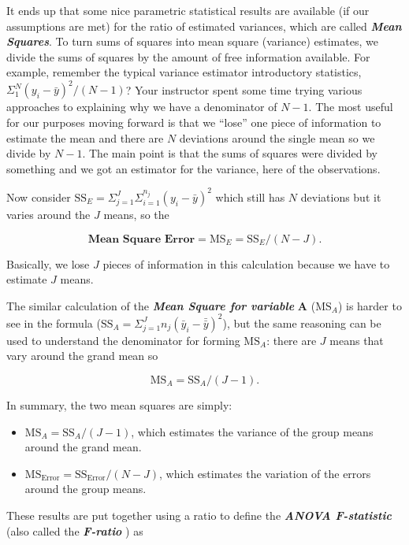 \documentclass[]{book}
\begin{document}
It ends up that some nice parametric statistical results are available
(if our assumptions are met) for the ratio of estimated variances, which
are called \textbf{\emph{Mean Squares}}. To turn sums of squares into
mean square (variance) estimates, we divide the sums of squares by the
amount of free information available. For example, remember the typical
variance estimator introductory statistics,
\(\Sigma^N_1(y_i-\bar{y})^2/(N-1)\)? Your instructor spent some time
trying various approaches to explaining why we have a denominator of
\(N-1\). The most useful for our purposes moving forward is that we
``lose'' one piece of information to estimate the mean and there are
\(N\) deviations around the single mean so we divide by \(N-1\). The
main point is that the sums of squares were divided by something and we
got an estimator for the variance, here of the observations.

Now consider
\(\text{SS}_E = \Sigma^J_{j=1}\Sigma^{n_j}_{i=1}(y_i-\bar{y})^2\) which
still has \(N\) deviations but it varies around the \(J\) means, so the

\[\textbf{Mean Square Error} = \text{MS}_E = \text{SS}_E/(N-J).\]

Basically, we lose \(J\) pieces of information in this calculation
because we have to estimate \(J\) means.

The similar calculation of the \textbf{\emph{Mean Square for variable}}
\(\mathbf{A}\) (\(\text{MS}_A\)) is harder to see in the formula
(\(\text{SS}_A = \Sigma^J_{j=1}n_j(\bar{y}_i-\bar{\bar{y}})^2\)), but
the same reasoning can be used to understand the denominator for forming
\(\text{MS}_A\): there are \(J\) means that vary around the grand mean
so

\[\text{MS}_A = \text{SS}_A/(J-1).\]

In summary, the two mean squares are simply:

\begin{itemize}
\item
  \(\text{MS}_A = \text{SS}_A/(J-1)\), which estimates the variance of
  the group means around the grand mean.
\item
  \(\text{MS}_{\text{Error}} = \text{SS}_{\text{Error}}/(N-J)\), which
  estimates the variation of the errors around the group means.
\end{itemize}

These results are put together using a ratio to define the
\textbf{\emph{ANOVA F-statistic}} (also called the
\textbf{\emph{F-ratio}} ) as
\end{document}
